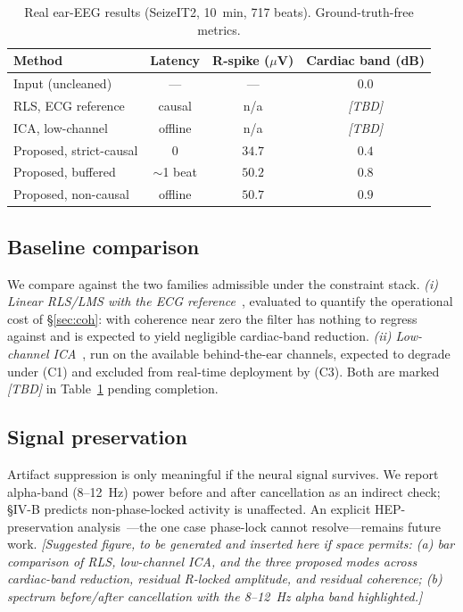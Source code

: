 \documentclass[conference]{IEEEtran}
\begin{document}
\begin{table}[t]
\centering
\caption{Real ear-EEG results (SeizeIT2, 10~min, 717 beats). Ground-truth-free metrics.}
\label{tab:modes}
\begin{tabular}{@{}lccc@{}}
\toprule
Method & Latency & R-spike ($\mu$V) & Cardiac band (dB) \\
\midrule
Input (uncleaned)              & ---        & ---   & $0.0$ \\
RLS, ECG reference             & causal     & n/a   & \emph{[TBD]} \\
ICA, low-channel               & offline    & n/a   & \emph{[TBD]} \\
\midrule
Proposed, strict-causal        & $0$        & $34.7$ & $0.4$ \\
Proposed, buffered             & $\sim$1 beat & $50.2$ & $0.8$ \\
Proposed, non-causal           & offline    & $50.7$ & $0.9$ \\
\bottomrule
\end{tabular}
\end{table}

\subsection{Baseline comparison}
\label{sec:baselines}
We compare against the two families admissible under the constraint stack. \emph{(i) Linear RLS/LMS
with the ECG reference}~\cite{widrow1975,haykin2014,sayed2008}, evaluated to quantify the
operational cost of \S\ref{sec:coh}: with coherence near zero the filter has nothing to regress
against and is expected to yield negligible cardiac-band reduction. \emph{(ii) Low-channel
ICA}~\cite{jung2000,pion2019}, run on the available behind-the-ear channels, expected to degrade
under (C1) and excluded from real-time deployment by (C3). Both are marked \emph{[TBD]} in
Table~\ref{tab:modes} pending completion.

\subsection{Signal preservation}
\label{sec:preserve}
Artifact suppression is only meaningful if the neural signal survives. We report alpha-band
(8--12~Hz) power before and after cancellation as an indirect check; \S IV-B predicts
non-phase-locked activity is unaffected. An explicit HEP-preservation
analysis~\cite{park2019}---the one case phase-lock cannot resolve---remains future work.
\emph{[Suggested figure, to be generated and inserted here if space permits: (a) bar comparison of
RLS, low-channel ICA, and the three proposed modes across cardiac-band reduction, residual R-locked
amplitude, and residual coherence; (b) spectrum before/after cancellation with the 8--12~Hz alpha
band highlighted.]}
\end{document}
